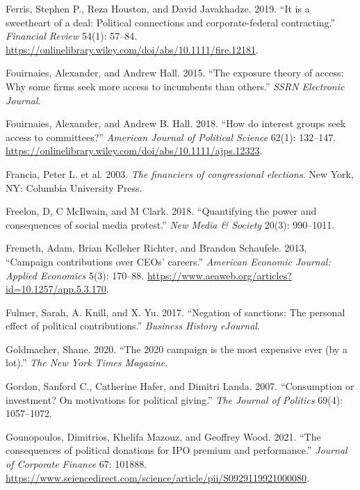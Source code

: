 \documentclass[12pt,]{article}
\begin{document}
\begin{CSLReferences}{1}{0}
\leavevmode{}%
Ferris, Stephen P., Reza Houston, and David Javakhadze. 2019. {``It is a
sweetheart of a deal: Political connections and corporate-federal
contracting.''} \emph{Financial Review} 54(1): 57--84.
\url{https://onlinelibrary.wiley.com/doi/abs/10.1111/fire.12181}.

\leavevmode{}%
Fouirnaies, Alexander, and Andrew Hall. 2015. {``The exposure theory of
access: Why some firms seek more access to incumbents than others.''}
\emph{SSRN Electronic Journal}.

\leavevmode{}%
Fouirnaies, Alexander, and Andrew B. Hall. 2018. {``How do interest
groups seek access to committees?''} \emph{American Journal of Political
Science} 62(1): 132--147.
\url{https://onlinelibrary.wiley.com/doi/abs/10.1111/ajps.12323}.

\leavevmode{}%
Francia, Peter L. et al. 2003. \emph{The financiers of congressional
elections}. New York, NY: Columbia University Press.

\leavevmode{}%
Freelon, D, C McIlwain, and M Clark. 2018. {``Quantifying the power and
consequences of social media protest.''} \emph{New Media \& Society}
20(3): 990--1011.

\leavevmode{}%
Fremeth, Adam, Brian Kelleher Richter, and Brandon Schaufele. 2013.
{``Campaign contributions over CEOs' careers.''} \emph{American Economic
Journal: Applied Economics} 5(3): 170--88.
\url{https://www.aeaweb.org/articles?id=10.1257/app.5.3.170}.

\leavevmode{}%
Fulmer, Sarah, A. Knill, and X. Yu. 2017. {``Negation of sanctions: The
personal effect of political contributions.''} \emph{Business History
eJournal}.

\leavevmode{}%
Goldmacher, Shane. 2020. {``The 2020 campaign is the most expensive ever
(by a lot).''} \emph{The New York Times Magazine}.

\leavevmode{}%
Gordon, Sanford C., Catherine Hafer, and Dimitri Landa. 2007.
{``Consumption or investment? On motivations for political giving.''}
\emph{The Journal of Politics} 69(4): 1057--1072.

\leavevmode{}%
Gounopoulos, Dimitrios, Khelifa Mazouz, and Geoffrey Wood. 2021. {``The
consequences of political donations for IPO premium and performance.''}
\emph{Journal of Corporate Finance} 67: 101888.
\url{https://www.sciencedirect.com/science/article/pii/S0929119921000080}.


\end{CSLReferences}
\end{document}
